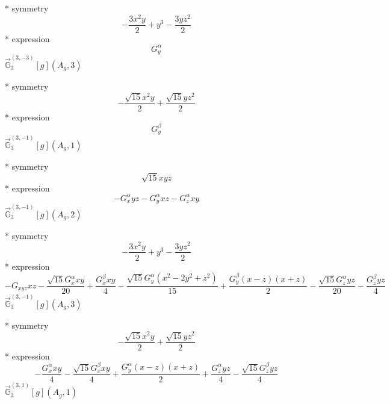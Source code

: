 \documentclass[fleqn,8pt]{jsarticle}
\begin{document}
\noindent\quad ** symmetry
\begin{dmath*}
- \frac{3 x^{2} y}{2} + y^{3} - \frac{3 y z^{2}}{2}
\end{dmath*}
\noindent\quad ** expression
\begin{dmath*}
G_{y}^{\alpha}
\end{dmath*}
\noindent\quad $\vec{\mathbb{G}}_{3}^{(3,-3)}[g](A_{g},3)$

\noindent\quad ** symmetry
\begin{dmath*}
- \frac{\sqrt{15} x^{2} y}{2} + \frac{\sqrt{15} y z^{2}}{2}
\end{dmath*}
\noindent\quad ** expression
\begin{dmath*}
G_{y}^{\beta}
\end{dmath*}
\noindent\quad $\vec{\mathbb{G}}_{3}^{(3,-1)}[g](A_{g},1)$

\noindent\quad ** symmetry
\begin{dmath*}
\sqrt{15} x y z
\end{dmath*}
\noindent\quad ** expression
\begin{dmath*}
- G_{x}^{\alpha} y z - G_{y}^{\alpha} x z - G_{z}^{\alpha} x y
\end{dmath*}
\noindent\quad $\vec{\mathbb{G}}_{3}^{(3,-1)}[g](A_{g},2)$

\noindent\quad ** symmetry
\begin{dmath*}
- \frac{3 x^{2} y}{2} + y^{3} - \frac{3 y z^{2}}{2}
\end{dmath*}
\noindent\quad ** expression
\begin{dmath*}
- G_{xyz} x z - \frac{\sqrt{15} G_{x}^{\alpha} x y}{20} + \frac{G_{x}^{\beta} x y}{4} - \frac{\sqrt{15} G_{y}^{\alpha} \left(x^{2} - 2 y^{2} + z^{2}\right)}{15} + \frac{G_{y}^{\beta} \left(x - z\right) \left(x + z\right)}{2} - \frac{\sqrt{15} G_{z}^{\alpha} y z}{20} - \frac{G_{z}^{\beta} y z}{4}
\end{dmath*}
\noindent\quad $\vec{\mathbb{G}}_{3}^{(3,-1)}[g](A_{g},3)$

\noindent\quad ** symmetry
\begin{dmath*}
- \frac{\sqrt{15} x^{2} y}{2} + \frac{\sqrt{15} y z^{2}}{2}
\end{dmath*}
\noindent\quad ** expression
\begin{dmath*}
- \frac{G_{x}^{\alpha} x y}{4} - \frac{\sqrt{15} G_{x}^{\beta} x y}{4} + \frac{G_{y}^{\alpha} \left(x - z\right) \left(x + z\right)}{2} + \frac{G_{z}^{\alpha} y z}{4} - \frac{\sqrt{15} G_{z}^{\beta} y z}{4}
\end{dmath*}
\noindent\quad $\vec{\mathbb{G}}_{3}^{(3,1)}[g](A_{g},1)$
\end{document}
